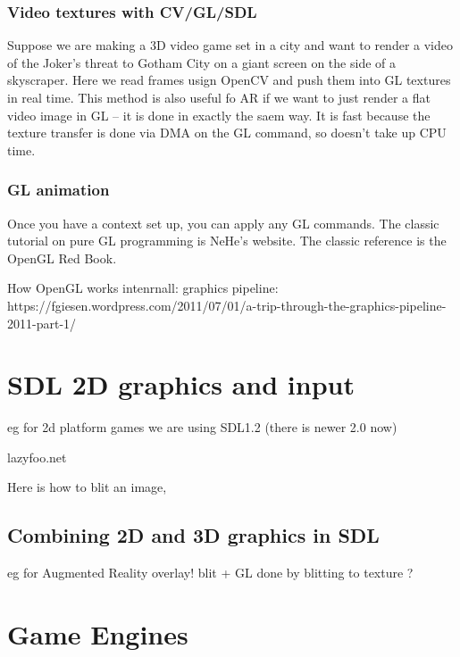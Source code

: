 \documentclass[oneside,english]{scrbook}
\begin{document}


\subsection{Video textures with CV/GL/SDL}

Suppose we are making a 3D video game set in a city and want to render a video of the Joker's threat to Gotham City on a giant screen on the side of a skyscraper.   Here we read frames usign OpenCV and push them into GL textures in real time.   This method is also useful fo AR if we want to just render a flat video image in GL -- it is done in exactly the saem way.  It is fast because the texture transfer is done via DMA on the GL command, so doesn't take up CPU time.



\subsection{GL animation}

Once you have a context set up, you can apply any GL commands. The classic tutorial on pure GL programming is NeHe's website.  The classic reference is the OpenGL Red Book.

How OpenGL works intenrnall: graphics pipeline: https://fgiesen.wordpress.com/2011/07/01/a-trip-through-the-graphics-pipeline-2011-part-1/

\chapter{SDL 2D graphics and input}
eg for 2d platform games
we are using SDL1.2 (there is newer 2.0 now)

lazyfoo.net

Here is how to blit an image,



\section{Combining 2D and 3D graphics in SDL}
eg for Augmented Reality overlay!
blit + GL
done by blitting to texture ?

\chapter{Game Engines}
\end{document}
